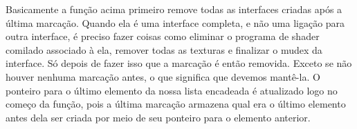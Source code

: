Basicamente a função acima primeiro remove todas as interfaces criadas
após a última marcação. Quando ela é uma interface completa, e não uma
ligação para outra interface, é preciso fazer coisas como eliminar o
programa de shader comilado associado à ela, remover todas as texturas
e finalizar o mudex da interface. Só depois de fazer isso que a
marcação é então removida. Exceto se não houver nenhuma marcação
antes, o que significa que devemos mantê-la. O ponteiro para o último
elemento da nossa lista encadeada é atualizado logo no começo da
função, pois a última marcação armazena qual era o último elemento
antes dela ser criada por meio de seu ponteiro para o elemento
anterior.





\fim
